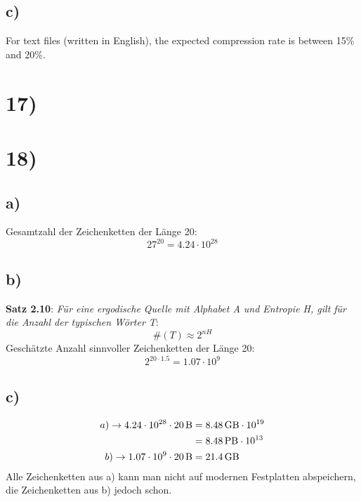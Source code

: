   \subsection*{c)}

  For text files (written in English), the expected compression rate is between 15\% and 20\%.

  \section*{17)}
  \section*{18)}

    \subsection*{a)}

      Gesamtzahl der Zeichenketten der Länge 20:\\
      \[27^{20} = 4.24 \cdot 10^{28} \]

    \subsection*{b)}

      \textbf{Satz 2.10}: \textit{Für eine ergodische Quelle mit Alphabet A und Entropie H, gilt für die Anzahl der typischen Wörter T}:
      \[ \#(T) \approx 2^{nH} \]
      \newline
      Geschätzte Anzahl sinnvoller Zeichenketten der Länge 20:
      \[ 2^{20 \cdot 1.5} = 1.07 \cdot 10^{9} \]

    \subsection*{c)}

      \begin{equation}
      	\begin{split}
      	  a) \rightarrow 4.24 \cdot 10^{28} \cdot \SI{20}{\byte} & = \SI{8.48}{\giga\byte} \cdot 10^{19} \\
      	  & = \SI{8.48}{\peta\byte} \cdot 10^{13} \\
      	  b) \rightarrow 1.07 \cdot 10^{9} \cdot \SI{20}{\byte} & = \SI{21.4}{\giga\byte} \\
      	\end{split}
      \end{equation}
      \newline
      Alle Zeichenketten aus a) kann man nicht auf modernen Festplatten abspeichern, die Zeichenketten aus b) jedoch schon.\\

